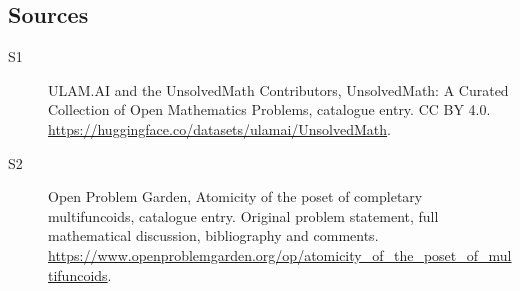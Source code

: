 \documentclass[11pt]{article}
\begin{document}
\subsection{Sources}
\begin{description}
\item[\hypertarget{source:statement:1}{S1}] ULAM.AI and the UnsolvedMath Contributors, UnsolvedMath: A Curated Collection of Open Mathematics Problems, catalogue entry. CC BY 4.0. \url{https://huggingface.co/datasets/ulamai/UnsolvedMath}.
\item[\hypertarget{source:statement:2}{S2}] Open Problem Garden, Atomicity of the poset of completary multifuncoids, catalogue entry. Original problem statement, full mathematical discussion, bibliography and comments. \url{https://www.openproblemgarden.org/op/atomicity_of_the_poset_of_multifuncoids}.
\end{description}
\label{end:statement}
\end{document}

